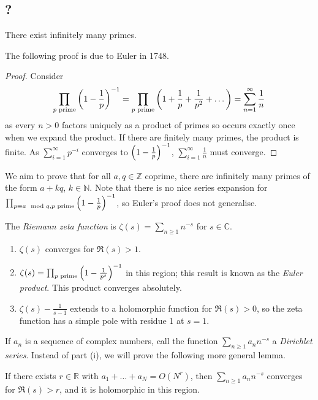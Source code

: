 \subsection{?}
\begin{theorem}[Euclid]
    There exist infinitely many primes.
\end{theorem}
The following proof is due to Euler in 1748.
\begin{proof}
    Consider
    \[ \prod_{p \text{ prime}} \qty(1 - \frac{1}{p})^{-1} = \prod_{p \text{ prime}} \qty(1 + \frac{1}{p} + \frac{1}{p^2} + \dots) = \sum_{n=1}^\infty \frac{1}{n} \]
    as every \( n > 0 \) factors uniquely as a product of primes so occurs exactly once when we expand the product.
    If there are finitely many primes, the product is finite.
    As \( \sum_{i=1}^\infty p^{-i} \) converges to \( \qty(1 - \frac{1}{p})^{-1} \), \( \sum_{i=1}^\infty \frac{1}{n} \) must converge.
\end{proof}
We aim to prove that for all \( a, q \in \mathbb Z \) coprime, there are infinitely many primes of the form \( a + kq \), \( k \in \mathbb N \).
Note that there is no nice series expansion for \( \prod_{p \equiv a \mod q, p \text{ prime}} \qty(1 - \frac{1}{p})^{-1} \), so Euler's proof does not generalise.
\begin{definition}
    The \emph{Riemann zeta function} is \( \zeta(s) = \sum_{n \geq 1} n^{-s} \) for \( s \in \mathbb C \).
\end{definition}
\begin{proposition}
    \begin{enumerate}
        \item \( \zeta(s) \) converges for \( \Re(s) > 1 \).
        \item \( \zeta(s) = \prod_{p \text{ prime}} \qty(1 - \frac{1}{p^s})^{-1} \) in this region; this result is known as the \emph{Euler product}.
        This product converges absolutely.
        \item \( \zeta(s) - \frac{1}{s - 1} \) extends to a holomorphic function for \( \Re(s) > 0 \), so the zeta function has a simple pole with residue 1 at \( s = 1 \).
    \end{enumerate}
\end{proposition}
If \( a_n \) is a sequence of complex numbers, call the function \( \sum_{n \geq 1} a_n n^{-s} \) a \emph{Dirichlet series}.
Instead of part (i), we will prove the following more general lemma.
\begin{lemma}
    If there exists \( r \in \mathbb R \) with \( a_1 + \dots + a_N = O(N^r) \), then \( \sum_{n \geq 1} a_n n^{-s} \) converges for \( \Re(s) > r \), and it is holomorphic in this region.
\end{lemma}
